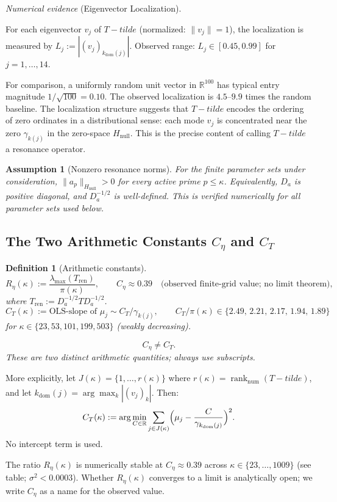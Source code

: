 \documentclass[11pt]{article}
\def\Tt{T-tilde}%
\newtheorem{definition}[theorem]{Definition}
\newtheorem{assumption}[theorem]{Assumption}
\newcommand{\Hnull}{H_{\mathrm{null}}}
\newcommand{\Tren}{T_{\mathrm{ren}}}
\newcommand{\Tt}{\widetilde{T}}
\newcommand{\Ceta}{C_{\eta}}
\newcommand{\CT}{C_{T}}
\newcommand{\kdom}{k_{\mathrm{dom}}}
\newcommand{\Da}{D_a}
\begin{document}
\emph{Numerical evidence} (Eigenvector Localization).

For each eigenvector $v_j$ of $\Tt$ (normalized: $\|v_j\|=1$),
the localization is measured by $L_j := |(v_j)_{\kdom(j)}|$.
Observed range: $L_j\in[0.45,0.99]$ for $j=1,\ldots,14$.

For comparison, a uniformly random unit vector in $\mathbb{R}^{100}$
has typical entry magnitude $1/\sqrt{100} = 0.10$.
The observed localization is $4.5$--$9.9$ times the random baseline.
The localization structure suggests that $\Tt$ encodes
the ordering of zero ordinates in a distributional sense:
each mode $v_j$ is concentrated near the zero $\gamma_{k(j)}$
in the zero-space $\Hnull$.
This is the precise content of calling $\Tt$ a resonance operator.

\begin{assumption}[Nonzero resonance norms]\label{ass:Da-pos}
For the finite parameter sets under consideration,
$\|a_p\|_{\Hnull}>0$ for every active prime $p\le\kappa$.
Equivalently, $\Da$ is positive diagonal, and $\Da^{-1/2}$
is well-defined. This is verified numerically for all
parameter sets used below.
\end{assumption}

\subsection{The Two Arithmetic Constants $\Ceta$ and $\CT$}

\begin{definition}[Arithmetic constants]\label{def:constants}
\[
R_\eta(\kappa) := \frac{\lambda_{\max}(\Tren)}{\pi(\kappa)},
\qquad
\Ceta \approx 0.39\quad\text{(observed finite-grid value; no limit theorem)},
\]
where $\Tren := \Da^{-1/2}T\Da^{-1/2}$.
\[
\CT(\kappa) := \text{OLS-slope of } \mu_j\sim\CT/\gamma_{k(j)},
\qquad \CT/\pi(\kappa) \in \{2.49,\,2.21,\,2.17,\,1.94,\,1.89\}
\]
for $\kappa\in\{23,53,101,199,503\}$ (weakly decreasing).

\[
\Ceta \neq \CT.
\]
\emph{These are two distinct arithmetic quantities; always use subscripts.}
\end{definition}

More explicitly, let $J(\kappa)=\{1,\ldots,r(\kappa)\}$ where
$r(\kappa)=\operatorname{rank}_{\mathrm{num}}(\Tt)$, and let
$\kdom(j)=\arg\max_k|(v_j)_k|$. Then:
\[
\CT(\kappa) := \arg\min_{C\in\mathbb{R}}
\sum_{j\in J(\kappa)}
\Bigl(\mu_j - \frac{C}{\gamma_{\kdom(j)}}\Bigr)^2.
\]
No intercept term is used.

The ratio $R_\eta(\kappa)$ is numerically stable at $\Ceta\approx 0.39$
across $\kappa\in\{23,\ldots,1009\}$ (see table; $\sigma^2 < 0.0003$).
Whether $R_\eta(\kappa)$ converges to a limit is analytically open;
we write $\Ceta$ as a name for the observed value.
\end{document}
